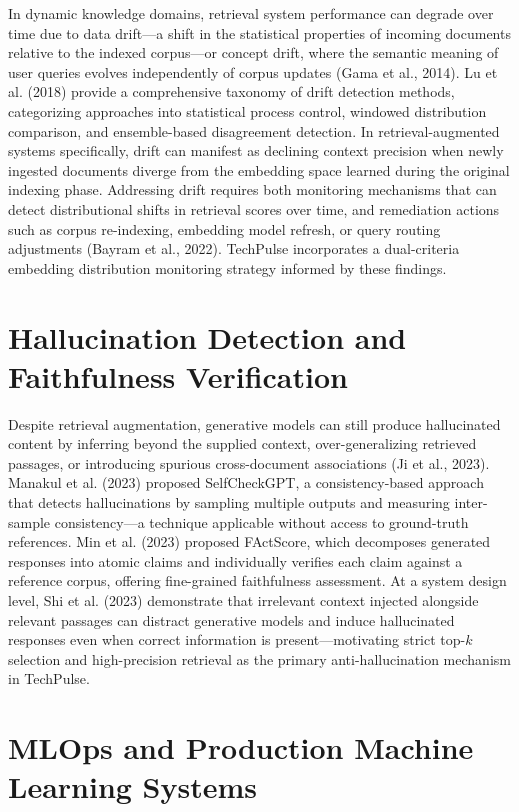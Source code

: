In dynamic knowledge domains, retrieval system performance can degrade over time due to data drift---a shift in the statistical properties of incoming documents relative to the indexed corpus---or concept drift, where the semantic meaning of user queries evolves independently of corpus updates (Gama et al., 2014). Lu et al. (2018) provide a comprehensive taxonomy of drift detection methods, categorizing approaches into statistical process control, windowed distribution comparison, and ensemble-based disagreement detection. In retrieval-augmented systems specifically, drift can manifest as declining context precision when newly ingested documents diverge from the embedding space learned during the original indexing phase. Addressing drift requires both monitoring mechanisms that can detect distributional shifts in retrieval scores over time, and remediation actions such as corpus re-indexing, embedding model refresh, or query routing adjustments (Bayram et al., 2022). TechPulse incorporates a dual-criteria embedding distribution monitoring strategy informed by these findings.

\section{Hallucination Detection and Faithfulness Verification}
\label{sec:lit_hallucination}

Despite retrieval augmentation, generative models can still produce hallucinated content by inferring beyond the supplied context, over-generalizing retrieved passages, or introducing spurious cross-document associations (Ji et al., 2023). Manakul et al. (2023) proposed SelfCheckGPT, a consistency-based approach that detects hallucinations by sampling multiple outputs and measuring inter-sample consistency---a technique applicable without access to ground-truth references. Min et al. (2023) proposed FActScore, which decomposes generated responses into atomic claims and individually verifies each claim against a reference corpus, offering fine-grained faithfulness assessment. At a system design level, Shi et al. (2023) demonstrate that irrelevant context injected alongside relevant passages can distract generative models and induce hallucinated responses even when correct information is present---motivating strict top-$k$ selection and high-precision retrieval as the primary anti-hallucination mechanism in TechPulse.

\section{MLOps and Production Machine Learning Systems}
\label{sec:lit_mlops}

